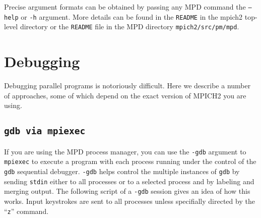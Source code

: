 \documentclass[dvipdfm,11pt]{article}
\begin{document}
Precise argument formats can be obtained by passing any MPD command the
\texttt{--help} or \texttt{-h} argument.  More details can be found in
the \texttt{README} in the mpich2 top-level directory or the
\texttt{README} file in the MPD directory \texttt{mpich2/src/pm/mpd}.


\section{Debugging}
\label{sec:debugging}

Debugging parallel programs is notoriously difficult.  Here we describe
a number of approaches, some of which depend on the exact version of
MPICH2 you are using. 


\subsection{\texttt{gdb via mpiexec}}
\label{sec:gdb via mpiexec}

If you are using the MPD process manager, you can use the
\texttt{-gdb} argument to \texttt{mpiexec} to execute a program with
each process running under the control of the \texttt{gdb} sequential
debugger.  \texttt{-gdb} helps control the multiple instances of
\texttt{gdb} by sending \texttt{stdin} either to all processes or to a
selected process and by labeling and merging output.  The following
script of a \texttt{-gdb} session gives an idea of how this works.
Input keystrokes are sent to all processes unless specifially directed
by the ``\texttt{z}'' command.
\end{document}
